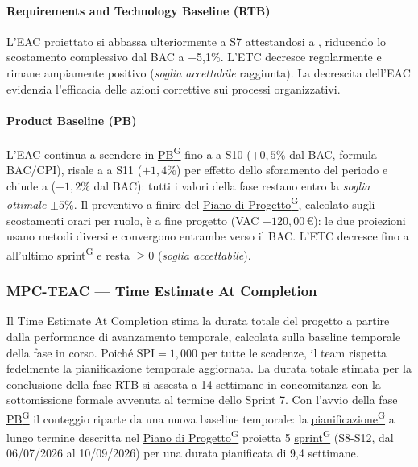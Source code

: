 \documentclass[a4paper,12pt]{article}
\providecommand{\glslink}[2]{\href{https://alittlebyte-19.github.io/Documentazione/glossario.html\#gls-#1}{\underline{#2}\textsuperscript{\scriptsize G}}}
\begin{document}
\paragraph*{Requirements and Technology Baseline (RTB)} L'EAC proiettato si abbassa ulteriormente a S7 attestandosi a , riducendo lo scostamento complessivo dal BAC a +5,1\%. L'ETC decresce regolarmente e rimane ampiamente positivo (\emph{soglia accettabile} raggiunta). La decrescita dell'EAC evidenzia l'efficacia delle azioni correttive sui processi organizzativi.

\paragraph*{Product Baseline (PB)} L'EAC continua a scendere in \glslink{pb-product-baseline}{PB} fino a  a S10 ($+0{,}5\%$ dal BAC, formula $\text{BAC}/\text{CPI}$), risale a  a S11 ($+1{,}4\%$) per effetto dello sforamento del periodo e chiude a  ($+1{,}2\%$ dal BAC): tutti i valori della fase restano entro la \emph{soglia ottimale} $\pm 5\%$. Il preventivo a finire del \glslink{piano-di-progetto}{Piano di Progetto}, calcolato sugli scostamenti orari per ruolo, è  a fine progetto (VAC $-120{,}00$\,\euro): le due proiezioni usano metodi diversi e convergono entrambe verso il BAC. L'ETC decresce fino a  all'ultimo \glslink{sprint}{sprint} e resta $\geq 0$ (\emph{soglia accettabile}).

\subsubsection{MPC-TEAC — Time Estimate At Completion}

Il Time Estimate At Completion stima la durata totale del progetto a partire dalla performance di avanzamento temporale, calcolata sulla baseline temporale della fase in corso. Poiché $\text{SPI} = 1{,}000$ per tutte le scadenze, il team rispetta fedelmente la pianificazione temporale aggiornata. La durata totale stimata per la conclusione della fase RTB si assesta a 14 settimane in concomitanza con la sottomissione formale avvenuta al termine dello Sprint 7. Con l'avvio della fase \glslink{pb-product-baseline}{PB} il conteggio riparte da una nuova baseline temporale: la \glslink{pianificazione}{pianificazione} a lungo termine descritta nel \glslink{piano-di-progetto}{Piano di Progetto} proietta 5 \glslink{sprint}{sprint} (S8-S12, dal 06/07/2026 al 10/09/2026) per una durata pianificata di 9,4 settimane.
\end{document}
